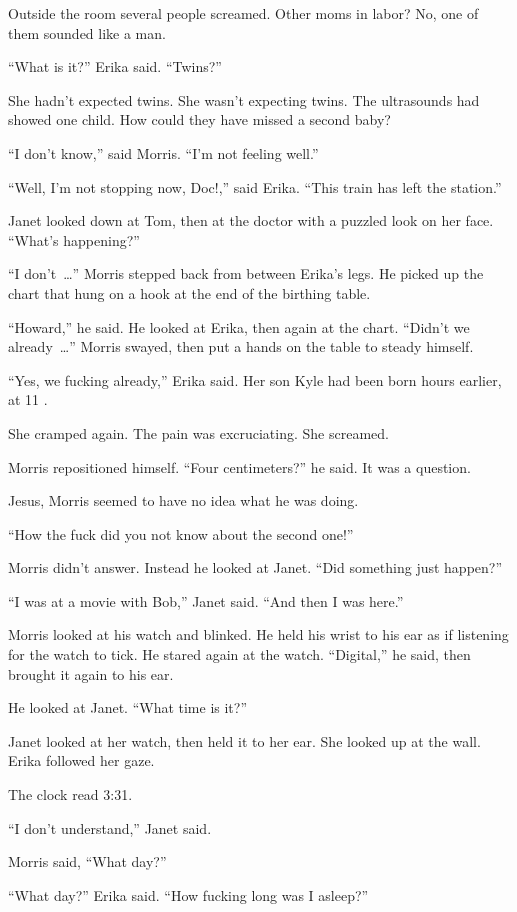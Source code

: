 Outside the room several people screamed. Other moms in labor? No, one of them sounded like a man.

“What is it?” Erika said. “Twins?”

She hadn’t expected twins. She wasn’t expecting twins. The ultrasounds had showed one child. How could they have missed a second baby?

“I don’t know,” said Morris. “I’m not feeling well.”

“Well, I’m not stopping now, Doc!,” said Erika. “This train has left the station.”

Janet looked down at Tom, then at the doctor with a puzzled look on her face. “What’s happening?”

“I don’t~…” Morris stepped back from between Erika’s legs. He picked up the chart that hung on a hook at the end of the birthing table.

“Howard,” he said. He looked at Erika, then again at the chart. “Didn’t we already~…” Morris swayed, then put a hands on the table to steady himself.

“Yes, we fucking already,” Erika said. Her son Kyle had been born hours earlier, at 11 .

She cramped again. The pain was excruciating. She screamed.

Morris repositioned himself. “Four centimeters?” he said. It was a question.

Jesus, Morris seemed to have no idea what he was doing.

“How the fuck did you not know about the second one!”

Morris didn’t answer. Instead he looked at Janet. “Did something just happen?”

“I was at a movie with Bob,” Janet said. “And then I was here.”

Morris looked at his watch and blinked. He held his wrist to his ear as if listening for the watch to tick. He stared again at the watch. “Digital,” he said, then brought it again to his ear.

He looked at Janet. “What time is it?”

Janet looked at her watch, then held it to her ear. She looked up at the wall. Erika followed her gaze.

The clock read 3:31.

“I don’t understand,” Janet said.

Morris said, “What day?”

“What day?” Erika said. “How fucking long was I asleep?”


